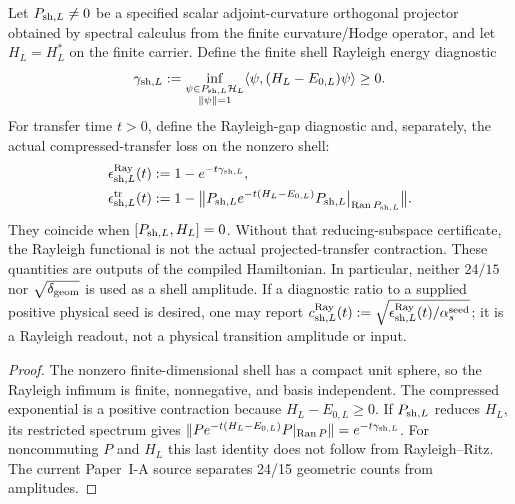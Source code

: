 \documentclass[12pt,a4paper]{article}
\providecommand{\deltageom}{\delta_{\rm geom}}
\providecommand{\alphasseed}{\alpha_s^{\rm seed}}
\begin{document}
\begin{theorem}
\label{p10:thm:primitive-scalar-shell-coefficient-fixed}
Let \(P_{{\rm sh},L}\ne0\) be a specified scalar adjoint-curvature orthogonal projector obtained by spectral calculus from the finite curvature/Hodge operator, and let \(H_L=H_L^*\) on the finite carrier. Define the finite shell Rayleigh energy diagnostic
\begin{equation}
\label{p10:eq:primitive-scalar-shell-coefficient-fixed}
\gamma_{{\rm sh},L}:=
\inf_{\substack{\psi\in P_{{\rm sh},L}\mathcal H_L\\\|\psi\|=1}}
\langle\psi,(H_L-E_{0,L})\psi\rangle\ge0.
\end{equation}
For transfer time \(t>0\), define the Rayleigh-gap diagnostic and, separately, the actual compressed-transfer loss on the nonzero shell:
\begin{equation}
\begin{aligned}
\epsilon_{{\rm sh},L}^{\rm Ray}(t)&:=1-e^{-t\gamma_{{\rm sh},L}},\\
\epsilon_{{\rm sh},L}^{\rm tr}(t)&:=1-\bigl\|P_{{\rm sh},L}e^{-t(H_L-E_{0,L})}P_{{\rm sh},L}\big|_{\operatorname{Ran}P_{{\rm sh},L}}\bigr\|.
\end{aligned}
\end{equation}
They coincide when \([P_{{\rm sh},L},H_L]=0\).  Without that reducing-subspace certificate, the Rayleigh functional is not the actual projected-transfer contraction.
These quantities are outputs of the compiled Hamiltonian.  In particular, neither \(24/15\) nor \(\sqrt{\deltageom}\) is used as a shell amplitude.  If a diagnostic ratio to a supplied positive physical seed is desired, one may report \(c_{{\rm sh},L}^{\rm Ray}(t):=\sqrt{\epsilon_{{\rm sh},L}^{\rm Ray}(t)/\alphasseed}\); it is a Rayleigh readout, not a physical transition amplitude or input.
\end{theorem}
\begin{proof}
The nonzero finite-dimensional shell has a compact unit sphere, so the Rayleigh infimum is finite, nonnegative, and basis independent. The compressed exponential is a positive contraction because \(H_L-E_{0,L}\ge0\). If \(P_{{\rm sh},L}\) reduces \(H_L\), its restricted spectrum gives \(\|P e^{-t(H_L-E_{0,L})}P|_{\operatorname{Ran}P}\|=e^{-t\gamma_{{\rm sh},L}}\). For noncommuting \(P\) and \(H_L\) this last identity does not follow from Rayleigh--Ritz. The current Paper~I-A source separates 24/15 geometric counts from amplitudes.
\end{proof}
\end{document}
